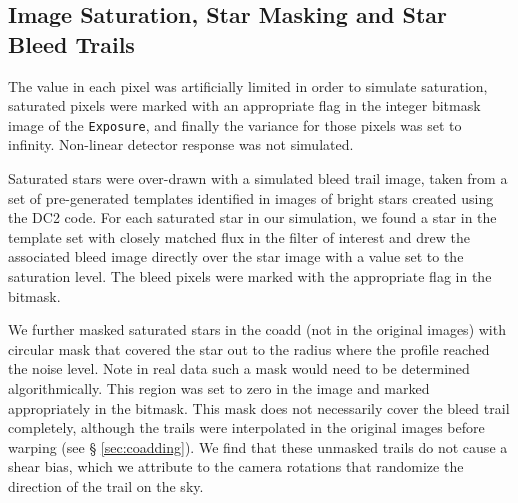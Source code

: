 \documentclass[twocolumn,twocolappendix,astrosym]{openjournal}
\newcommand{\calexp}{\texttt{Exposure}}
\begin{document}
\subsection{Image Saturation, Star Masking and Star Bleed Trails} \label{sec:sim:satbleeds}

The value in each pixel was artificially limited in order to simulate
saturation, saturated pixels were marked with an appropriate flag in the
integer bitmask image of the \calexp, and finally the variance for those
pixels was set to infinity.  Non-linear detector response was not simulated.

Saturated stars were over-drawn with a simulated bleed trail image, taken from
a set of pre-generated templates identified in images of bright stars created
using the DC2 code.  For each saturated star in our simulation, we found a star
in the template set with closely matched flux in the filter of interest and
drew the associated bleed image directly over the star image with a value set
to the saturation level.  The bleed pixels were marked with the appropriate
flag in the bitmask.

We further masked saturated stars in the coadd (not in the original images)
with circular mask that covered the star out to the radius where the profile
reached the noise level.  Note in real data such a mask would need to be
determined algorithmically. This region was set to zero in the image and
marked appropriately in the bitmask.   This mask does not necessarily cover the
bleed trail completely, although the trails were interpolated in the
original images before warping (see \S
\ref{sec:coadding}).  We find that these unmasked trails do not cause a shear
bias, which we attribute to the camera rotations that randomize the direction
of the trail on the sky.
\end{document}

